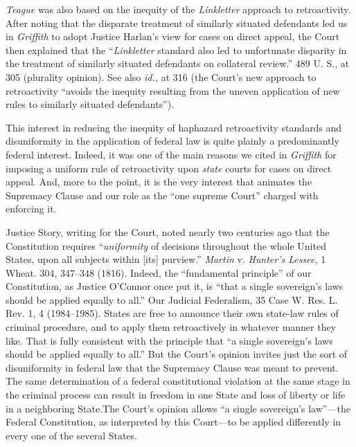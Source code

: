  \emph{Teague} was also based on the inequity of the \emph{Linkletter} approach to retroactivity. After noting that the disparate treatment of similarly situated defendants led us in \emph{Griffith} to adopt Justice Harlan's view for cases on direct appeal, the Court then explained that the ``\emph{Linkletter} standard also led to unfortunate disparity in the treatment of similarly situated defendants on collateral review.'' 489 U. S., at 305 (plurality opinion). See also \emph{id.,} at 316 (the Court's new approach to retroactivity ``avoids the inequity resulting from the uneven application of new rules to similarly situated defendants'').

  This interest in reducing the inequity of haphazard retroactivity standards and disuniformity in the application of federal law is quite plainly a predominantly federal interest. Indeed, it was one of the main reasons we cited in \emph{Griffith} for imposing a uniform rule of retroactivity upon \emph{state} courts for cases on direct appeal. And, more to the point, it is the very interest that animates the Supremacy Clause and our role as the ``one supreme Court'' charged with enforcing it.

  Justice Story, writing for the Court, noted nearly two centuries ago that the Constitution requires ``\emph{uniformity} of decisions throughout the whole United States, upon all subjects within [its] purview.'' \emph{Martin} v. \emph{Hunter's Lessee,} 1 Wheat. 304, 347--348 (1816). Indeed, the ``fundamental principle'' of \newpage  our Constitution, as Justice O'Connor once put it, is ``that a single sovereign's laws should be applied equally to all.'' Our Judicial Federalism, 35 Case W. Res. L. Rev. 1, 4 (1984--1985). States are free to announce their own state-law rules of criminal procedure, and to apply them retroactively in whatever manner they like. That is fully consistent with the principle that ``a single sovereign's laws should be applied equally to all.'' But the Court's opinion invites just the sort of disuniformity in federal law that the Supremacy Clause was meant to prevent. The same determination of a federal constitutional violation at the same stage in the criminal process can result in freedom in one State and loss of liberty or life in a neighboring State.\footnotemark[2] The Court's opinion allows ``a single sovereign's law''---the Federal Constitution, as interpreted by this Court---to be applied differently in every one of the several States.

